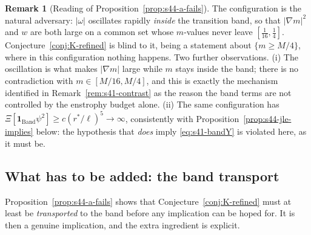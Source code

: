 \documentclass[11pt]{article}
\theoremstyle{definition}
\newtheorem{remark}[theorem]{Remark}
\theoremstyle{remark}
\begin{document}
\begin{remark}[Reading of Proposition~\ref{prop:s44-a-fails}]
  \label{rem:s44-reading}
  The configuration is the natural adversary: $|\omega|$ oscillates rapidly
  \emph{inside} the transition band, so that $|\nabla m|^2$ and $w$ are both
  large on a common set whose $m$-values never leave $[\tfrac1{16},\tfrac14]$.
  Conjecture~\ref{conj:K-refined} is blind to it, being a statement about
  $\{m\geq M/4\}$, where in this configuration nothing happens. Two further
  observations. (i) The oscillation is what makes $|\nabla m|$ large while
  $m$ stays inside the band; there is no contradiction with $m\in[M/16,M/4]$,
  and this is exactly the mechanism identified in
  Remark~\ref{rem:s41-contrast} as the reason the band terms are not
  controlled by the enstrophy budget alone. (ii) The same configuration has
  $\Xi[\mathbf{1}_{\mathrm{Band}}\psi^2]\geq c(r^*/\ell)^{5}\to\infty$,
  consistently with Proposition~\ref{prop:s44-jle-implies} below: the
  hypothesis that \emph{does} imply \eqref{eq:s41-bandY} is violated here, as
  it must be.
\end{remark}

\subsection{What has to be added: the band transport}
\label{subsec:s44-transport}

Proposition~\ref{prop:s44-a-fails} shows that
Conjecture~\ref{conj:K-refined} must at least be \emph{transported} to the
band before any implication can be hoped for. It is then a genuine
implication, and the extra ingredient is explicit.
\end{document}
